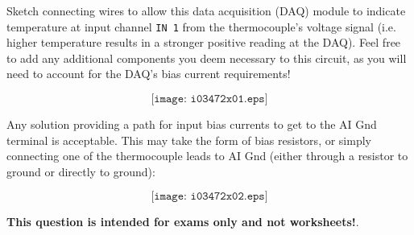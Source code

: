 

Sketch connecting wires to allow this data acquisition (DAQ) module to indicate temperature at input channel {\tt IN 1} from the thermocouple's voltage signal (i.e. higher temperature results in a stronger positive reading at the DAQ).  Feel free to add any additional components you deem necessary to this circuit, as you will need to account for the DAQ's bias current requirements!

\vskip 50pt

$$\texttt{[image: i03472x01.eps]}$$







Any solution providing a path for input bias currents to get to the AI Gnd terminal is acceptable.  This may take the form of bias resistors, or simply connecting one of the thermocouple leads to AI Gnd (either through a resistor to ground or directly to ground):

$$\texttt{[image: i03472x02.eps]}$$







{\bf This question is intended for exams only and not worksheets!}.


